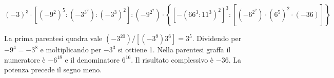
\begin{esercizio}
\[
    (-3)^3\cdot[(-9^2)^5:(-3^{3^2}):(-3^3)^2]:(-9^{2^2})
    \cdot
    \left\{[-(66^3:11^3)^2]^3:[(-6^{2^2})\cdot(6^5)^2\cdot(-36)]\right\}
    \]
\end{esercizio}

\begin{soluzione}
La prima parentesi quadra vale $(-3^{20})/[(-3^9)3^6]=3^5$.
Dividendo per $-9^4=-3^8$ e moltiplicando per $-3^3$ si ottiene 1.
Nella parentesi graffa il numeratore è $-6^{18}$ e il denominatore $6^{16}$.
Il risultato complessivo è $-36$. La potenza precede il segno meno.
\end{soluzione}
